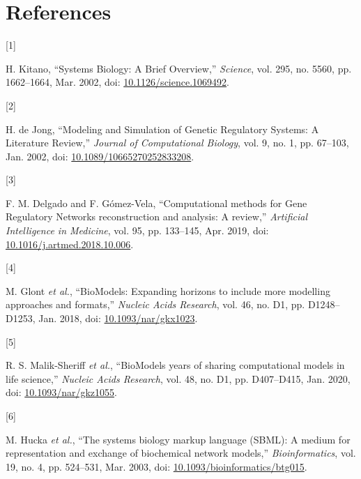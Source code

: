 \documentclass[
]{article}
\newlength{\cslhangindent}
\newlength{\csllabelwidth}
\newlength{\cslentryspacingunit} %
\newenvironment{CSLReferences}[2] %
 {%
  \setlength{\parindent}{0pt}
  \ifodd #1
  \let\oldpar\par
  \def\par{\hangindent=\cslhangindent\oldpar}
  \fi
  \setlength{\parskip}{#2\cslentryspacingunit}
 }%
 {}
\newcommand{\CSLLeftMargin}[1]{\parbox[t]{\csllabelwidth}{#1}}
\newcommand{\CSLRightInline}[1]{\parbox[t]{\linewidth - \csllabelwidth}{#1}\break}
\begin{document}
\hypertarget{references}{%
\section*{References}\label{references}}

\hypertarget{refs}{}
\begin{CSLReferences}{0}{0}
\leavevmode{}%
\CSLLeftMargin{{[}1{]} }%
\CSLRightInline{H. Kitano, {``Systems {Biology}: {A Brief Overview},''}
\emph{Science}, vol. 295, no. 5560, pp. 1662--1664, Mar. 2002, doi:
\href{https://doi.org/10.1126/science.1069492}{10.1126/science.1069492}.}

\leavevmode{}%
\CSLLeftMargin{{[}2{]} }%
\CSLRightInline{H. de Jong, {``Modeling and {Simulation} of {Genetic
Regulatory Systems}: {A Literature Review},''} \emph{Journal of
Computational Biology}, vol. 9, no. 1, pp. 67--103, Jan. 2002, doi:
\href{https://doi.org/10.1089/10665270252833208}{10.1089/10665270252833208}.}

\leavevmode{}%
\CSLLeftMargin{{[}3{]} }%
\CSLRightInline{F. M. Delgado and F. Gómez-Vela, {``Computational
methods for {Gene Regulatory Networks} reconstruction and analysis: {A}
review,''} \emph{Artificial Intelligence in Medicine}, vol. 95, pp.
133--145, Apr. 2019, doi:
\href{https://doi.org/10.1016/j.artmed.2018.10.006}{10.1016/j.artmed.2018.10.006}.}

\leavevmode{}%
\CSLLeftMargin{{[}4{]} }%
\CSLRightInline{M. Glont \emph{et al.}, {``{BioModels}: Expanding
horizons to include more modelling approaches and formats,''}
\emph{Nucleic Acids Research}, vol. 46, no. D1, pp. D1248--D1253, Jan.
2018, doi:
\href{https://doi.org/10.1093/nar/gkx1023}{10.1093/nar/gkx1023}.}

\leavevmode{}%
\CSLLeftMargin{{[}5{]} }%
\CSLRightInline{R. S. Malik-Sheriff \emph{et al.},
{``{BioModels}\textemdash 15 years of sharing computational models in
life science,''} \emph{Nucleic Acids Research}, vol. 48, no. D1, pp.
D407--D415, Jan. 2020, doi:
\href{https://doi.org/10.1093/nar/gkz1055}{10.1093/nar/gkz1055}.}

\leavevmode{}%
\CSLLeftMargin{{[}6{]} }%
\CSLRightInline{M. Hucka \emph{et al.}, {``The systems biology markup
language ({SBML}): A medium for representation and exchange of
biochemical network models,''} \emph{Bioinformatics}, vol. 19, no. 4,
pp. 524--531, Mar. 2003, doi:
\href{https://doi.org/10.1093/bioinformatics/btg015}{10.1093/bioinformatics/btg015}.}


\end{CSLReferences}
\end{document}
